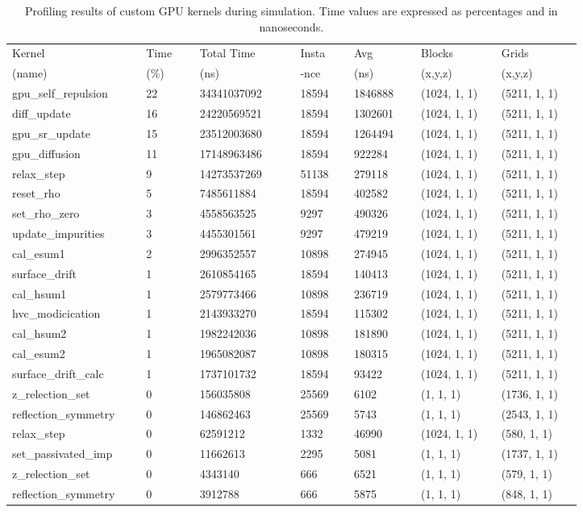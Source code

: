 \begin{table}[!ht]
\centering
\renewcommand{\arraystretch}{1.2} %
\setlength{\tabcolsep}{4pt} %
\begin{tabular}{|p{0.20\linewidth}|p{0.08\linewidth}|p{0.15\linewidth}|p{0.08\linewidth}|p{0.10\linewidth}|p{0.12\linewidth}|p{0.12\linewidth}|}
\hline
Kernel & Time & Total Time & Insta & Avg & Blocks & Grids \\
 (name) &  (\%) & (ns) & -nce &  (ns) & (x,y,z) & (x,y,z) \\
\hline
gpu\_self\_repulsion & 22 & 34341037092& 18594& 1846888 & (1024, 1, 1) & (5211, 1, 1) \\
diff\_update & 16 & 24220569521& 18594& 1302601 & (1024, 1, 1) & (5211, 1, 1) \\
gpu\_sr\_update & 15 & 23512003680& 18594& 1264494 & (1024, 1, 1) & (5211, 1, 1) \\
gpu\_diffusion & 11 & 17148963486& 18594& 922284 & (1024, 1, 1) & (5211, 1, 1) \\
relax\_step & 9 & 14273537269& 51138& 279118& (1024, 1, 1) & (5211, 1, 1) \\
reset\_rho & 5& 7485611884& 18594& 402582 & (1024, 1, 1) & (5211, 1, 1) \\
set\_rho\_zero & 3& 4558563525& 9297& 490326 & (1024, 1, 1) & (5211, 1, 1) \\
update\_impurities & 3& 4455301561& 9297& 479219 & (1024, 1, 1) & (5211, 1, 1) \\
cal\_esum1 & 2& 2996352557& 10898& 274945 & (1024, 1, 1) & (5211, 1, 1) \\
surface\_drift & 1 & 2610854165& 18594& 140413 & (1024, 1, 1) & (5211, 1, 1) \\
cal\_hsum1 & 1 & 2579773466& 10898& 236719 & (1024, 1, 1) & (5211, 1, 1) \\
hvc\_modicication & 1 & 2143933270& 18594& 115302 & (1024, 1, 1) & (5211, 1, 1) \\
cal\_hsum2 & 1 & 1982242036& 10898& 181890 & (1024, 1, 1) & (5211, 1, 1) \\
cal\_esum2 & 1 & 1965082087& 10898& 180315 & (1024, 1, 1) & (5211, 1, 1) \\
surface\_drift\_calc & 1 & 1737101732& 18594& 93422 & (1024, 1, 1) & (5211, 1, 1) \\
z\_relection\_set & 0 & 156035808& 25569& 6102 & (1, 1, 1) & (1736, 1, 1) \\
reflection\_symmetry & 0 & 146862463& 25569& 5743 & (1, 1, 1) & (2543, 1, 1) \\
relax\_step & 0& 62591212& 1332& 46990 & (1024, 1, 1) & (580, 1, 1) \\
set\_passivated\_imp & 0& 11662613& 2295& 5081 & (1, 1, 1) & (1737, 1, 1) \\
z\_relection\_set & 0& 4343140& 666& 6521 & (1, 1, 1) & (579, 1, 1) \\
reflection\_symmetry & 0& 3912788& 666& 5875 & (1, 1, 1) & (848, 1, 1) \\
\hline
\end{tabular}
\caption{Profiling results of custom GPU kernels during simulation. Time values are expressed as percentages and in nanoseconds.}
\label{ch4:tab:gpu_kernels}
\end{table}